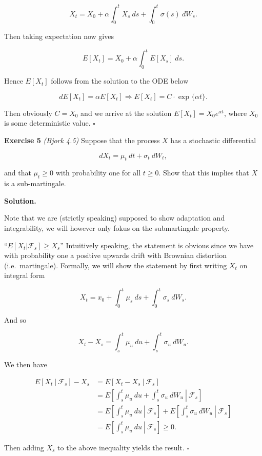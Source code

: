 \documentclass[
]{book}
\begin{document}
\[
X_t=X_0+\alpha\int_0^tX_s\ ds+\int_0^t\sigma(s)\ dW_s.
\]

Then taking expectation now gives

\[
E[X_t]=X_0+\alpha\int_0^tE[X_s]\ ds.
\]

Hence \(E[X_t]\) follows from the solution to the ODE below

\[
dE[X_t]=\alpha E[X_t]\Rightarrow E[X_t]=C\cdot\exp\{\alpha t\}.
\]

Then obviously \(C=X_0\) and we arrive at the solution \(E[X_t]=X_0e^{\alpha t}\), where \(X_0\) is some deterministic value. \(\square\)

\textbf{Exercise 5} \emph{(Bjork 4.5)} Suppose that the process \(X\) has a stochastic differential

\[
dX_t=\mu_t\ dt+\sigma_t\ dW_t,
\]

and that \(\mu_t\ge 0\) with probability one for all \(t\ge 0\). Show that this implies that \(X\) is a sub-martingale.

\textbf{Solution.}

Note that we are (strictly speaking) supposed to show adaptation and integrability, we will however only fokus on the submartingale property.

``\(E[X_t\vert \mathcal{F}_s]\ge X_s\)'' Intuitively speaking, the statement is obvious since we have with probability one a positive upwards drift with Brownian distortion (i.e.~martingale). Formally, we will show the statement by first writing \(X_t\) on integral form

\[
X_t=x_0+\int_0^t\mu_s\ ds+\int_0^t\sigma_s\ dW_s.
\]

And so

\[
X_t-X_s=\int_s^t\mu_u\ du+\int_s^t\sigma_u\ dW_u.
\]

We then have

\begin{align*}
E[X_t\ \vert\ \mathcal{F}_s]-X_s&=E[X_t-X_s\ \vert\ \mathcal{F}_s]\\
&=E\left[\left.\int_s^t\mu_u\ du+\int_s^t\sigma_u\ dW_u\ \right\vert\ \mathcal{F}_s\right]\\
&=E\left[\left.\int_s^t\mu_u\ du\ \right\vert\ \mathcal{F}_s\right]+E\left[\left.\int_s^t\sigma_u\ dW_u\ \right\vert\ \mathcal{F}_s\right]\\
&=E\left[\left.\int_s^t\mu_u\ du\ \right\vert\ \mathcal{F}_s\right]\ge 0.
\end{align*}

Then adding \(X_s\) to the above inequality yields the result. \(\square\)
\end{document}
